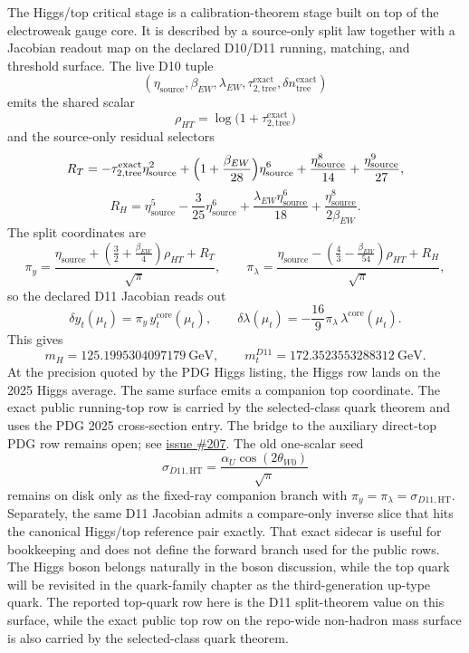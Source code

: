 \documentclass[11pt]{article}
\begin{document}
The Higgs/top critical stage is a calibration-theorem stage built on top of the electroweak gauge core.
It is described by a source-only split law together with a Jacobian readout map on the declared D10/D11 running, matching, and threshold surface. The live D10 tuple
\[
(\eta_{\mathrm{source}},\beta_{EW},\lambda_{EW},\tau_{2,\mathrm{tree}}^{\mathrm{exact}},\delta n_{\mathrm{tree}}^{\mathrm{exact}})
\]
emits the shared scalar
\[
\rho_{HT}=\log\!\bigl(1+\tau_{2,\mathrm{tree}}^{\mathrm{exact}}\bigr)
\]
and the source-only residual selectors
\[
R_T=
-\tau_{2,\mathrm{tree}}^{\mathrm{exact}}\eta_{\mathrm{source}}^2
+\Bigl(1+\frac{\beta_{EW}}{28}\Bigr)\eta_{\mathrm{source}}^6
+\frac{\eta_{\mathrm{source}}^8}{14}
+\frac{\eta_{\mathrm{source}}^9}{27},
\]
\[
R_H=
\eta_{\mathrm{source}}^5
-\frac{3}{25}\eta_{\mathrm{source}}^6
+\frac{\lambda_{EW}\eta_{\mathrm{source}}^6}{18}
+\frac{\eta_{\mathrm{source}}^8}{2\beta_{EW}}.
\]
The split coordinates are
\[
\pi_y=
\frac{\eta_{\mathrm{source}}+\left(\frac32+\frac{\beta_{EW}}4\right)\rho_{HT}+R_T}{\sqrt{\pi}},
\qquad
\pi_\lambda=
\frac{\eta_{\mathrm{source}}-\left(\frac43-\frac{\beta_{EW}}{54}\right)\rho_{HT}+R_H}{\sqrt{\pi}},
\]
so the declared D11 Jacobian reads out
\[
\delta y_t(\mu_t)=\pi_y\,y_t^{\mathrm{core}}(\mu_t),
\qquad
\delta\lambda(\mu_t)=-\frac{16}{9}\pi_\lambda\,\lambda^{\mathrm{core}}(\mu_t).
\]
This gives
\[
m_H = 125.1995304097179~\mathrm{GeV},
\qquad
m_t^{D11} = 172.3523553288312~\mathrm{GeV}.
\]
At the precision quoted by the PDG Higgs listing, the Higgs row lands on the 2025 Higgs average. The
same surface emits a companion top coordinate. The exact public running-top row is carried by the
selected-class quark theorem and uses the PDG 2025 cross-section entry. The bridge to the auxiliary
direct-top PDG row remains open; see \href{https://github.com/FloatingPragma/observer-patch-holography/issues/207}{issue \#207}.
The old one-scalar seed
\[
\sigma_{D11,\mathrm{HT}}=\frac{\alpha_U\cos(2\theta_{W0})}{\sqrt{\pi}}
\]
remains on disk only as the fixed-ray companion branch with \(\pi_y=\pi_\lambda=\sigma_{D11,\mathrm{HT}}\).
Separately, the same D11 Jacobian admits a compare-only inverse slice that hits the canonical
Higgs/top reference pair exactly. That exact sidecar is useful for bookkeeping and does not define
the forward branch used for the public rows.
The Higgs boson belongs naturally in the boson discussion, while the top quark will be revisited
in the quark-family chapter as the third-generation up-type quark. The reported top-quark row here is
the D11 split-theorem value on this surface, while the exact public top row on the repo-wide non-hadron mass surface is also carried by the selected-class quark theorem.
\end{document}
